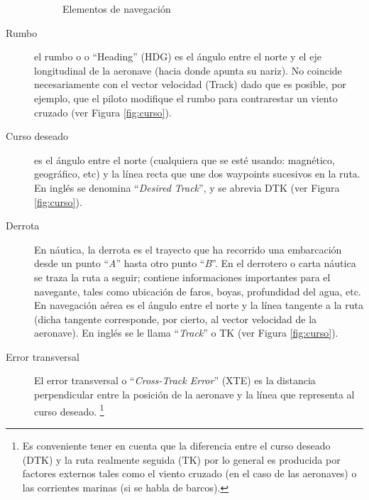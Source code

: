 \documentclass[a4paper,12pt,twoside]{article}
\begin{document}
\begin{description}
\begin{figure}[!h]
  \caption{Elementos de navegaci\'on}
\end{figure}


  \item[Rumbo] el rumbo o o ``Heading'' (HDG) es el \'angulo entre el norte y el eje   longitudinal de la aeronave (hacia donde apunta su nariz). No
  coincide necesariamente con el vector velocidad (Track) dado que es
  posible, por ejemplo, que el piloto modifique el rumbo para
  contrarestar un viento cruzado (ver Figura \ref{fig:curso}).

\item [Curso deseado] es el \'angulo entre el norte (cualquiera que se est\'e usando: magn\'etico, geogr\'afico, etc) y la l\'inea recta que une dos waypoints sucesivos en la ruta. En ingl\'es se denomina ``\textit{Desired Track}'', y se abrevia DTK (ver Figura \ref{fig:curso}).

\item [Derrota] En n\'autica, la derrota es el trayecto que ha recorrido una embarcaci\'on desde un punto ``\textit{A}'' hasta otro punto ``\textit{B}''. En el derrotero o carta n\'autica se traza la ruta a seguir; contiene informaciones importantes para el navegante, tales como ubicaci\'on de faros, boyas, profundidad del agua, etc. En navegaci\'on a\'erea es el \'angulo entre el norte y la l\'inea tangente a la ruta (dicha tangente corresponde, por cierto, al vector velocidad de la aeronave). En ingl\'es se le llama ``\textit{Track}'' o TK (ver Figura \ref{fig:curso}).

\item [Error transversal] El error transversal o ``\textit{Cross-Track Error}'' (XTE) es la distancia perpendicular entre la posici\'on de la aeronave y la l\'inea que representa al curso deseado. \footnote{Es conveniente tener en cuenta que la diferencia entre el curso deseado (DTK) y la ruta realmente seguida (TK) por lo general es producida por factores externos tales como el viento cruzado (en el caso de las aeronaves) o las corrientes marinas (si se habla de barcos).}

\end{description}
\end{document}
